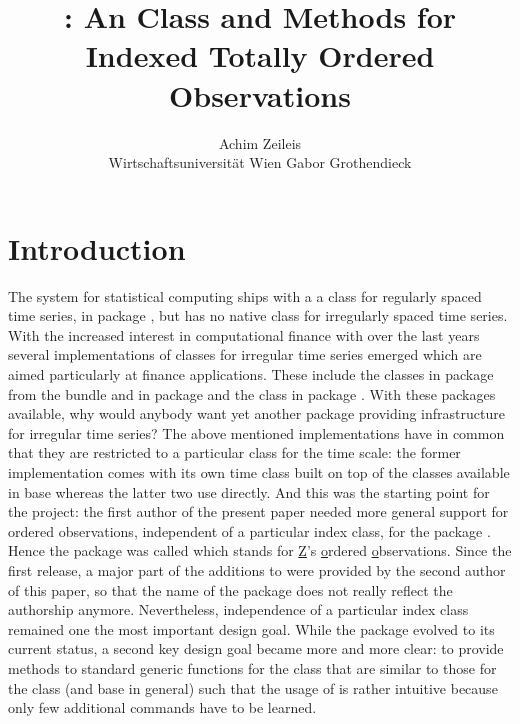 \documentclass{Z}
\author{Achim Zeileis\\Wirtschaftsuniversit\"at Wien \And
        Gabor Grothendieck}
\title{\pkg{zoo}: An \proglang{S3} Class and Methods for
  Indexed Totally Ordered Observations}
\begin{document}




\section{Introduction} \label{sec:intro}

The  system for statistical computing
\citep[\url{http://www.R-project.org/}]{zoo:R:2004}
ships with a a class for regularly spaced time series,
 in package , but has no native class for
irregularly spaced time series. With the increased interest in
computational finance with  over the last years
several implementations of classes for irregular time series 
emerged which are aimed particularly at finance applications.
These include the  classes 
in package  from the  bundle \citep{zoo:fBasics:2004}
and  in package  \citep{zoo:tseries:2004}
and the  class  in package  \citep{zoo:its:2004}.
With these packages available, why would anybody want yet another 
package providing infrastructure for irregular time series?
The above mentioned implementations have in common that they are restricted to a particular
class for the time scale: the former implementation comes with its own time class
 built on top of the  classes
available in base  whereas the latter two use  directly.
And this was the starting point for the  project: the first author
of the present paper needed
more general support for ordered observations, independent of a particular
index class, for the package 
\citep{zoo:Zeileis+Leisch+Hornik:2002}. Hence the package was called
 which stands for \underline{Z}'s \underline{o}rdered \underline{o}bservations.
Since the first release, a major part of the additions to 
were provided by the second author of this paper, so that the name
of the package does not really reflect the authorship anymore.
Nevertheless, independence of a particular index class remained one
the most important design goal. While the package evolved to its current
status, a second key design goal became more and more clear: to provide
methods to standard generic functions for the  class that 
are similar to those for the  class (and base  in
general) such that the usage of  is rather intuitive because
only few additional commands have to be learned.
\end{document}

